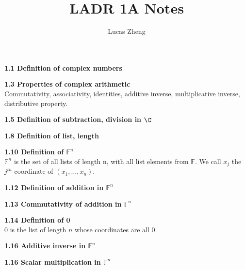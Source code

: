 \documentclass[12pt, letterpaper]{article}
\title{LADR 1A Notes}
\author{Lucas Zheng}
\date{}
\begin{document}
\maketitle

\textbf{1.1 Definition of complex numbers}

\textbf{1.3 Properties of complex arithmetic}\\
Commutativity, associativity, identities, additive inverse, multiplicative inverse, distributive property.

\textbf{1.5 Definition of subtraction, division in $\C$}

\textbf{1.8 Definition of list, length}

\textbf{1.10 Definition of $\mathbb{F}^n$}\\
$\mathbb{F}^n$ is the set of all lists of length n, with all list elements from $\mathbb{F}$.
We call $x_j$ the $j^{th}$ coordinate of $(x_1,\ldots,x_n)$.

\textbf{1.12 Definition of addition in $\mathbb{F}^n$}

\textbf{1.13 Commutativity of addition in $\mathbb{F}^n$}

\textbf{1.14 Definition of 0}\\
0 is the list of length $n$ whose coordinates are all 0.

\textbf{1.16 Additive inverse in $\mathbb{F}^n$}

\textbf{1.16 Scalar multiplication in $\mathbb{F}^n$}
\end{document}
